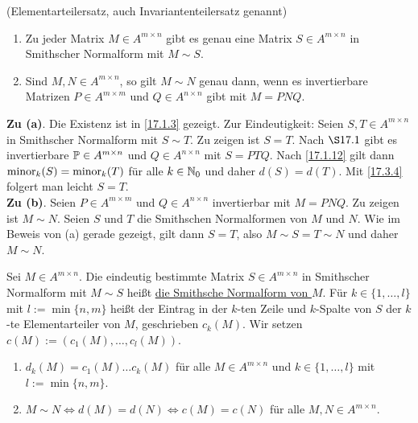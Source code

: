 \documentclass[../../main.tex]{subfiles}
\begin{document}
\begin{sat}\label{17.3.5}
(Elementarteilersatz, auch Invariantenteilersatz genannt)
\begin{enumerate}[\normalfont(a)]
\item Zu jeder Matrix $M\in A^{m\times n}$ gibt es genau eine Matrix $S\in A^{m\times n}$ in Smithscher Normalform mit $M\sim S$.
\item Sind $M,N\in A^{m\times n}$, so gilt $M\sim N$ genau dann, wenn es invertierbare Matrizen $P\in A^{m\times m}$ und $Q\in A^{n\times n}$ gibt mit $M=PNQ$.
\end{enumerate}
\end{sat}
\begin{cproof}
\textbf{Zu (a)}. Die Existenz ist in \ref{17.1.3} gezeigt. Zur Eindeutigkeit: Seien $S,T\in A^{m\times n}$ in Smithscher Normalform mit $S\sim T$. Zu zeigen ist $S=T$. Nach $\S 17.1$ gibt es invertierbare $\P\in A^{m\times n}$ und $Q\in A^{n\times n}$ mit $S=PTQ$. Nach \ref{17.1.12} gilt dann $\minor_k(S)=\minor_k(T)$ für alle $k\in\N_0$ und daher $d(S)=d(T)$. Mit \ref{17.3.4} folgert man leicht $S=T$.\\

\noindent\textbf{Zu (b)}. Seien $P\in A^{m\times m}$ und $Q\in A^{n\times n}$ invertierbar mit $M=PNQ$. Zu zeigen ist $M\sim N$. Seien $S$ und $T$ die Smithschen Normalformen von $M$ und $N$. Wie im Beweis von (a) gerade gezeigt, gilt dann $S=T$, also $M\sim S=T\sim N$ und daher $M\sim N$.
\end{cproof}

\begin{df}\label{17.3.6}
Sei $M\in A^{m\times n}$. Die eindeutig bestimmte Matrix $S\in A^{m\times n}$ in Smithscher Normalform mit $M\sim S$ heißt \underline{die Smithsche Normalform von $M$}. Für $k\in \{1,\ldots ,l\}$ mit $l:=\min\{n,m\}$ heißt der Eintrag in der $k$-ten Zeile und $k$-Spalte von $S$ der $k$-te Elementarteiler von $M$, geschrieben $c_k(M)$. Wir setzen $c(M):=(c_1(M),\ldots ,c_l(M))$.
\end{df}

\begin{kor}\label{17.3.7}
\begin{enumerate}[\normalfont(a)]
\item $d_k(M)=c_1(M)\ldots c_k(M)$ für alle $M\in A^{m\times n}$ und $k\in\{1,\ldots ,l\}$ mit $l:=\min\{n,m\}$.
\item $M\sim N\Longleftrightarrow d(M)=d(N)\Longleftrightarrow c(M)=c(N)$ für alle $M,N\in A^{m\times n}$.
\end{enumerate}
\end{kor}
\end{document}
